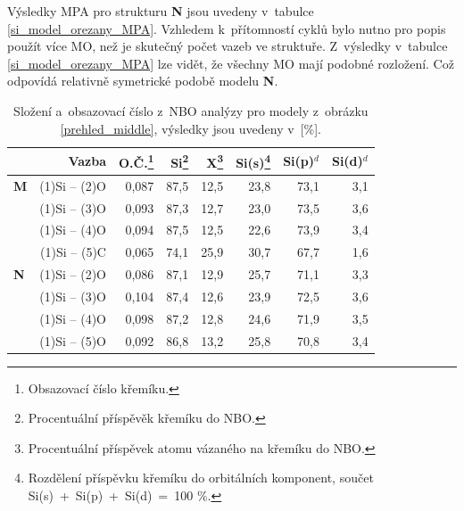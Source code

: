 \documentclass[
digital, %
table,   %
nolof,     %
nolot,     %
oneside,
]{fithesis3}
\begin{document}
Výsledky MPA pro strukturu \textbf{N} jsou uvedeny v~tabulce \ref{si_model_orezany_MPA}. Vzhledem k~přítomností cyklů bylo nutno pro popis použít více MO, než je skutečný počet vazeb ve struktuře. Z~výsledky v~tabulce \ref{si_model_orezany_MPA} lze vidět, že všechny MO mají podobné rozložení. Což odpovídá relativně symetrické podobě modelu \textbf{N}.
\begin{table}[H]
\begin{minipage}{\textwidth}
\caption{Složení a~obsazovací číslo z~NBO analýzy pro modely z~obrázku \ref{prehled_middle}, výsledky jsou uvedeny v~[\%].}
\begin{tabular}{|l|r|r|r|r|r|r|r|}
\hline
\label{nbo_middle} &  Vazba & O.Č.\footnote{Obsazovací číslo křemíku.} & Si\footnote{Procentuální příspěvěk křemíku do NBO.} & X\footnote{Procentuální příspěvek atomu vázaného na křemíku do NBO.} & Si(s)\footnote{Rozdělení příspěvku křemíku do orbitálních komponent, součet Si(s)~+~Si(p)~+~Si(d)~=~100 \%.} & Si(p)$^d$ &Si(d)$^d$ \\ \hline
\textbf{M} & (1)Si -- (2)O & 0,087 & 87,5  & 12,5  & 23,8  & 73,1  & 3,1  \\ \hline
& (1)Si -- (3)O & 0,093 & 87,3  & 12,7  & 23,0  & 73,5  & 3,6  \\ \hline
&(1)Si -- (4)O & 0,094 & 87,5  & 12,5  & 22,6  & 73,9  & 3,4  \\ \hline
& (1)Si -- (5)C & 0,065 & 74,1  & 25,9  & 30,7  & 67,7  & 1,6  \\ \hline
\textbf{N} & (1)Si -- (2)O & 0,086 & 87,1  & 12,9  & 25,7  & 71,1  & 3,3  \\ \hline
& (1)Si -- (3)O & 0,104 & 87,4  & 12,6  & 23,9  & 72,5  & 3,6  \\ \hline
& (1)Si -- (4)O & 0,098 & 87,2  & 12,8  & 24,6  & 71,9  & 3,5  \\ \hline
& (1)Si -- (5)O & 0,092 & 86,8  & 13,2  & 25,8  & 70,8  & 3,4  \\ \hline
\end{tabular}
\end{minipage}
\end{table}
\end{document}

